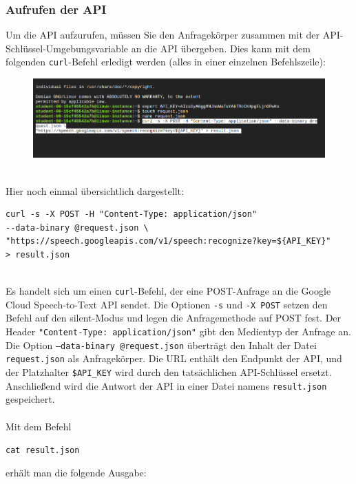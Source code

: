\documentclass[12pt,a4paper]{article}
\begin{document}
\subsubsection{Aufrufen der API}
Um die API aufzurufen, müssen Sie den Anfragekörper zusammen mit der API-Schlüssel-Umgebungsvariable an die API übergeben. Dies kann mit dem folgenden \texttt{curl}-Befehl erledigt werden (alles in einer einzelnen Befehlszeile):

\begin{figure}[h!]
	\centering
	\includegraphics[width=1\linewidth]{../images/curl}
\end{figure}
\ \\
Hier noch einmal übersichtlich dargestellt:
\begin{verbatim}
curl -s -X POST -H "Content-Type: application/json" 
--data-binary @request.json \
"https://speech.googleapis.com/v1/speech:recognize?key=${API_KEY}" 
> result.json
\end{verbatim}
\ \\
Es handelt sich um einen \texttt{curl}-Befehl, der eine POST-Anfrage an die Google Cloud Speech-to-Text API sendet. Die Optionen \texttt{-s} und \texttt{-X POST} setzen den Befehl auf den silent-Modus und legen die Anfragemethode auf POST fest. Der Header \texttt{"Content-Type: application/json"} gibt den Medientyp der Anfrage an. Die Option \texttt{--data-binary @request.json} überträgt den Inhalt der Datei \texttt{request.json} als Anfragekörper. Die URL enthält den Endpunkt der API, und der Platzhalter \texttt{\${API\_KEY}} wird durch den tatsächlichen API-Schlüssel ersetzt. Anschließend wird die Antwort der API in einer Datei namens \texttt{result.json} gespeichert.
\\ \\
Mit dem Befehl
\begin{center}
	\verb|cat result.json|
\end{center}
erhält man die folgende Ausgabe:
\end{document}
